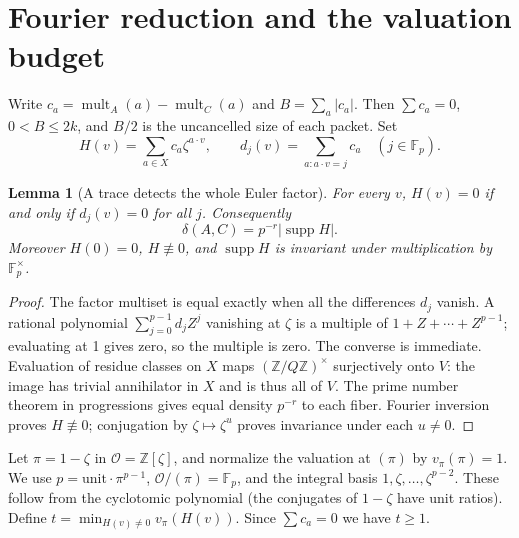 \documentclass[11pt]{article}
\newtheorem{lemma}[theorem]{Lemma}
\theoremstyle{definition}\newtheorem{definition}[theorem]{Definition}
\theoremstyle{remark}\newtheorem{remark}[theorem]{Remark}
\newcommand{\F}{\mathbb F}
\newcommand{\Z}{\mathbb Z}
\newcommand{\supp}{\operatorname{supp}}
\begin{document}
\section{Fourier reduction and the valuation budget}
Write $c_a=\operatorname{mult}_A(a)-\operatorname{mult}_C(a)$ and $B=\sum_a |c_a|$. Then $\sum c_a=0$, $0<B\le2k$, and $B/2$ is the uncancelled size of each packet. Set
\[
 H(v)=\sum_{a\in X}c_a\zeta^{a\cdot v},\qquad
 d_j(v)=\sum_{a:a\cdot v=j}c_a\quad(j\in\F_p).
\]
\begin{lemma}[A trace detects the whole Euler factor]\label{lem:trace}
For every $v$, $H(v)=0$ if and only if $d_j(v)=0$ for all $j$. Consequently
\[\delta(A,C)=p^{-r}|\supp H|.\]
Moreover $H(0)=0$, $H\not\equiv0$, and $\supp H$ is invariant under multiplication by $\F_p^\times$.
\end{lemma}
\begin{proof}
The factor multiset is equal exactly when all the differences $d_j$ vanish. A rational polynomial $\sum_{j=0}^{p-1}d_jZ^j$ vanishing at $\zeta$ is a multiple of $1+Z+\cdots+Z^{p-1}$; evaluating at 1 gives zero, so the multiple is zero. The converse is immediate. Evaluation of residue classes on $X$ maps $(\Z/Q\Z)^\times$ surjectively onto $V$: the image has trivial annihilator in $X$ and is thus all of $V$. The prime number theorem in progressions gives equal density $p^{-r}$ to each fiber. Fourier inversion proves $H\not\equiv0$; conjugation by $\zeta\mapsto\zeta^u$ proves invariance under each $u\ne0$.
\end{proof}

Let $\pi=1-\zeta$ in $\mathcal O=\Z[\zeta]$, and normalize the valuation at $(\pi)$ by $v_\pi(\pi)=1$. We use $p=\text{unit}\cdot\pi^{p-1}$, $\mathcal O/(\pi)=\F_p$, and the integral basis $1,\zeta,\dots,\zeta^{p-2}$. These follow from the cyclotomic polynomial (the conjugates of $1-\zeta$ have unit ratios). Define $t=\min_{H(v)\ne0}v_\pi(H(v))$. Since $\sum c_a=0$ we have $t\ge1$.
\end{document}
